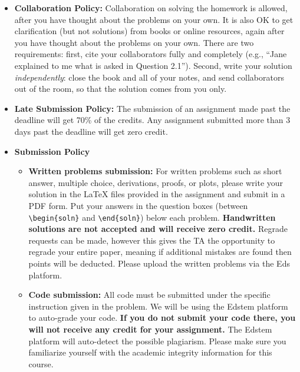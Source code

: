 \begin{itemize}
\item \textbf{Collaboration Policy:} Collaboration on solving the homework is allowed, after you have thought about the problems on your own. It is also OK to get clarification (but not solutions) from books or online resources, again after you have thought about the problems on your own. There are two requirements: first, cite your collaborators fully and completely (e.g., ``Jane explained to me what is asked in Question 2.1''). Second, write your solution {\em independently}: close the book and all of your notes, and send collaborators out of the room, so that the solution comes from you only. 

\item\textbf{Late Submission Policy:} The submission of an assignment made past the deadline will get 70\% of the credits. Any assignment submitted more than 3 days past the deadline will get zero credit.

\item\textbf{Submission Policy} 

\begin{itemize}
\item \textbf{Written problems submission:} For written problems such as short answer, multiple choice, derivations, proofs, or plots, please write your solution in the LaTeX files provided in the assignment and submit in a PDF form. Put your answers in the question boxes (between \texttt{\textbackslash begin\{soln\}} and \texttt{\textbackslash end\{soln\}}) below each problem. \textbf{Handwritten solutions are not accepted and will receive zero credit.} Regrade requests can be made, however this gives the TA the opportunity to regrade your entire paper, meaning if additional mistakes are found then points will be deducted. Please upload the written problems via the Eds platform.

\item \textbf{Code submission:} All code must be submitted under the specific instruction given in the problem. We will be using the Edstem platform to auto-grade your code. \textbf{If you do not submit your code there, you will not receive any credit for your assignment.} The Edstem platform will auto-detect the possible plagiarism. Please make sure you familiarize yourself with the academic integrity information for this course.

\end{itemize}


\end{itemize}
